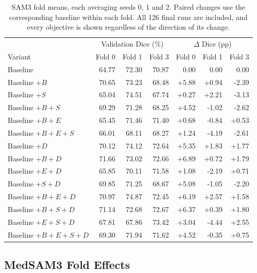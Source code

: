 \documentclass[12pt,a4paper]{article}
\begin{document}
\begin{table}[htbp]
\centering\small{}
\setlength{\tabcolsep}{5pt}
\renewcommand{\arraystretch}{1.12}
\begin{tabular}{@{}lrrrrrr@{}}
\hline
 & \multicolumn{3}{c}{Validation Dice (\%)} & \multicolumn{3}{c}{$\Delta$ Dice (pp)} \\
Variant & Fold 0 & Fold 1 & Fold 3 & Fold 0 & Fold 1 & Fold 3 \\
\hline
Baseline & 64.77 & 72.30 & 70.87 & 0.00 & 0.00 & 0.00 \\
Baseline $+B$ & 70.65 & 73.23 & 68.48 & +5.88 & +0.94 & -2.39 \\
Baseline $+S$ & 65.04 & 74.51 & 67.74 & +0.27 & +2.21 & -3.13 \\
Baseline $+B+S$ & 69.29 & 71.28 & 68.25 & +4.52 & -1.02 & -2.62 \\
Baseline $+B+E$ & 65.45 & 71.46 & 71.40 & +0.68 & -0.84 & +0.53 \\
Baseline $+B+E+S$ & 66.01 & 68.11 & 68.27 & +1.24 & -4.19 & -2.61 \\
Baseline $+D$ & 70.12 & 74.12 & 72.64 & +5.35 & +1.83 & +1.77 \\
Baseline $+B+D$ & 71.66 & 73.02 & 72.66 & +6.89 & +0.72 & +1.79 \\
Baseline $+E+D$ & 65.85 & 70.11 & 71.58 & +1.08 & -2.19 & +0.71 \\
Baseline $+S+D$ & 69.85 & 71.25 & 68.67 & +5.08 & -1.05 & -2.20 \\
Baseline $+B+E+D$ & 70.97 & 74.87 & 72.45 & +6.19 & +2.57 & +1.58 \\
Baseline $+B+S+D$ & 71.14 & 72.68 & 72.67 & +6.37 & +0.39 & +1.80 \\
Baseline $+E+S+D$ & 67.81 & 67.86 & 73.42 & +3.04 & -4.44 & +2.55 \\
Baseline $+B+E+S+D$ & 69.30 & 71.94 & 71.62 & +4.52 & -0.35 & +0.75 \\
\hline
\end{tabular}
\caption{SAM3 fold means, each averaging seeds 0, 1 and 2. Paired changes
use the corresponding baseline within each fold. All 126 final runs
are included, and every objective is shown regardless of the direction
of its change.}
\label{tab:sam3-geo-folds}
\end{table}

\FloatBarrier

\subsection{MedSAM3 Fold Effects}
\end{document}
